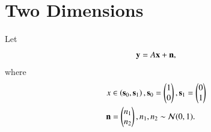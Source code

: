 \documentclass[journal,12pt,twocolumn]{IEEEtran}
\begin{document}
\section{Two Dimensions}
Let 
\begin{equation}
\mathbf{y} = A\mathbf{x} + \mathbf{n},
\end{equation}
where 
\begin{align}
x &\in \left(\mathbf{s}_0,\mathbf{s}_1\right), 
\mathbf{s}_0 = 
\begin{pmatrix}
1 
\\
0
\end{pmatrix},
\mathbf{s}_1 = 
\begin{pmatrix}
0 
\\
1
\end{pmatrix}
\\
\mathbf{n} &= 
\begin{pmatrix}
n_1
\\
n_2
\end{pmatrix},
n_1,n_2 \sim \mathcal{N}(0, 1).
\end{align}
%
\end{document}
